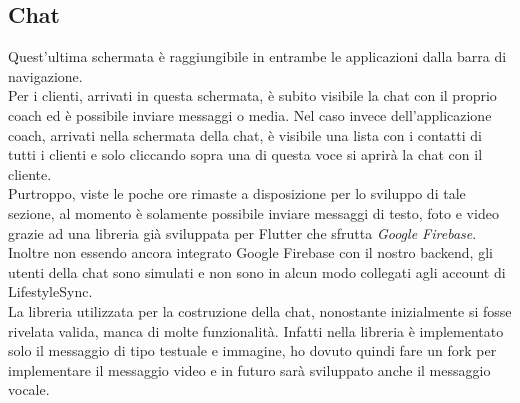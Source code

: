 \subsection{Chat}
Quest'ultima schermata è raggiungibile in entrambe le applicazioni dalla barra di navigazione.\\
Per i clienti, arrivati in questa schermata, è subito visibile la chat con il proprio coach ed è possibile inviare messaggi o media. Nel caso invece dell'applicazione coach, arrivati nella schermata della chat, è visibile una lista con i contatti di tutti i clienti e solo cliccando sopra una di questa voce si aprirà la chat con il cliente.\\
Purtroppo, viste le poche ore rimaste a disposizione per lo sviluppo di tale sezione, al momento è solamente possibile inviare messaggi di testo, foto e video grazie ad una libreria già sviluppata per Flutter che sfrutta \textit{Google Firebase}. Inoltre non essendo ancora integrato Google Firebase con il nostro backend, gli utenti della chat sono simulati e non sono in alcun modo collegati agli account di LifestyleSync.\\
La libreria utilizzata per la costruzione della chat, nonostante inizialmente si fosse rivelata valida, manca di molte funzionalità. Infatti nella libreria è implementato solo il messaggio di tipo testuale e immagine, ho dovuto quindi fare un \gls{fork} per implementare il messaggio video e in futuro sarà sviluppato anche il messaggio vocale.

